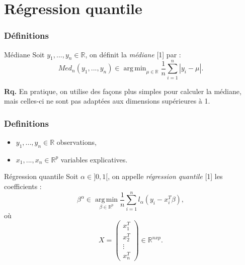 \documentclass[unknownkeysallowed]{beamer}
\DeclareMathOperator*{\argmin}{arg\,min}
\begin{document}




\section{Régression quantile}
\label{sec:Régression quantile}



\begin{frame}
\frametitle{Définitions}
\begin{block}{Médiane}
Soit $y_1, ..., y_n \in \mathbb{R}$, on définit la \textit{médiane} [1] par :
$$Med_{n}(y_1, ..., y_n) \in \argmin_{\mu \in \mathbb{R}} \frac{1}{n} \sum\limits_{i=1}^{n} | y_i - \mu |.$$
\end{block}
\vspace{0.5cm}
\textbf{Rq.} En pratique, on utilise des façons plus simples pour calculer la médiane, mais celles-ci ne sont pas adaptées aux dimensions supérieures à 1.
\end{frame}


\begin{frame}
\frametitle{Definitions}
\begin{itemize}
    \item $y_1, ..., y_n \in \mathbb{R}$ observations,
    \item $x_1, ..., x_n \in \mathbb{R}^p$ variables explicatives.
\end{itemize}
\vspace{0.1cm}
\begin{block}{Régression quantile}
Soit $\alpha \in ]0,1[$, on appelle \textit{régression quantile} [1] les coefficients :
$$\beta^{\alpha} \in \argmin\limits_{\beta \in \mathbb{R}^p} \frac{1}{n} \sum\limits_{i=1}^{n} l_{\alpha}(y_i - x_i^T\beta),$$
où 
$$X = \begin{pmatrix}
x_1^T \\
x_2^T \\
\vdots\\
x_n^T
\end{pmatrix} 
\in \mathbb{R}^{nxp}.$$
\end{block}
\end{frame}
\end{document}

